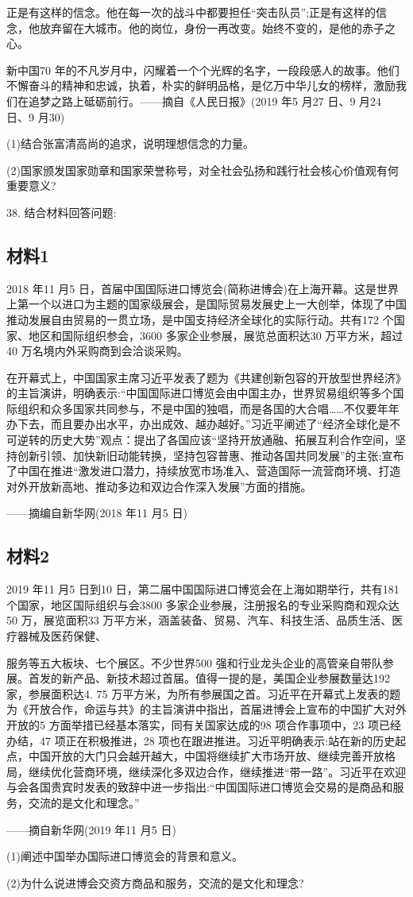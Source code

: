 \documentclass[UTF8,11pt]{ctexart}
\begin{document}
正是有这样的信念。他在每一次的战斗中都要担任“突击队员”;正是有这样的信念，他放弃留在大城市。他的岗位，身份一再改变。始终不变的，是他的赤子之心。

新中国70 年的不凡岁月中，闪耀着一个个光辉的名字，一段段感人的故事。他们不懈奋斗的精神和忠诚，执着，朴实的鲜明品格，是亿万中华儿女的榜样，激励我们在追梦之路上砥砺前行。——摘自《人民日报》(2019 年5 月27 日、9 月24 日、9 月30)

(1)结合张富清高尚的追求，说明理想信念的力量。


(2)国家颁发国家勋章和国家荣誉称号，对全社会弘扬和践行社会核心价值观有何重要意义?


38. 结合材料回答问题:


\subsection*{材料1}

2018 年11 月5 日，首届中国国际进口博览会(简称进博会)在上海开幕。这是世界上第一个以进口为主题的国家级展会，是国际贸易发展史上一大创举，体现了中国推动发展自由贸易的一贯立场，是中国支持经济全球化的实际行动。共有172 个国家、地区和国际组织参会，3600 多家企业参展，展览总面积达30 万平方米，超过40 万名境内外采购商到会洽谈采购。

在开幕式上，中国国家主席习近平发表了题为《共建创新包容的开放型世界经济》的主旨演讲，明确表示:“中国国际进口博览会由中国主办，世界贸易组织等多个国际组织和众多国家共同参与，不是中国的独唱，而是各国的大合唱……不仅要年年办下去，而且要办出水平，办出成效、越办越好。”习近平阐述了“经济全球化是不可逆转的历史大势”观点：提出了各国应该“坚持开放通融、拓展互利合作空间，坚持创新引领、加快新旧动能转换，坚持包容普惠、推动各国共同发展”的主张;宣布了中国在推进“激发进口潜力，持续放宽市场准入、营造国际一流营商环境、打造对外开放新高地、推动多边和双边合作深入发展”方面的措施。

——摘编自新华网(2018 年11 月5 日)

\subsection*{材料2}

2019 年11 月5 日到10 日，第二届中国国际进口博览会在上海如期举行，共有181 个国家，地区国际组织与会3800 多家企业参展，注册报名的专业采购商和观众达50 万，展览面积33 万平方米，涵盖装备、贸易、汽车、科技生活、品质生活、医疗器械及医药保健、


服务等五大板块、七个展区。不少世界500 强和行业龙头企业的高管亲自带队参展。首发的新产品、新技术超过首届。值得一提的是，美国企业参展数量达192 家，参展面积达4. 75 万平方米，为所有参展国之首。习近平在开幕式上发表的题为《开放合作，命运与共》的主旨演讲中指出，首届进博会上宣布的中国扩大对外开放的5 方面举措已经基本落实，同有关国家达成的98 项合作事项中，23 项已经办结，47 项正在积极推进，28 项也在跟进推进。习近平明确表示:站在新的历史起点，中国开放的大门只会越开越大，中国将继续扩大市场开放、继续完善开放格局，继续优化营商环境，继续深化多双边合作，继续推进“带一路”。习近平在欢迎与会各国贵宾时发表的致辞中进一步指出:“中国国际进口博览会交易的是商品和服务，交流的是文化和理念。”

——摘自新华网(2019 年11 月5 日)

(1)阐述中国举办国际进口博览会的背景和意义。


(2)为什么说进博会交资方商品和服务，交流的是文化和理念?
\end{document}

